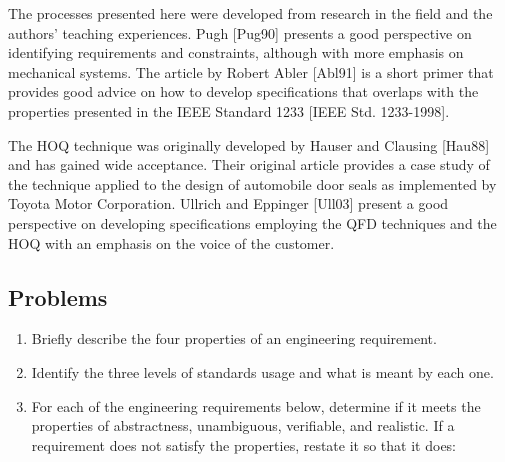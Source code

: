 The processes presented here were developed from research in the field
and the authors' teaching experiences. Pugh {[}Pug90{]} presents a good
perspective on identifying requirements and constraints, although with
more emphasis on mechanical systems. The article by Robert Abler
{[}Abl91{]} is a short primer that provides good advice on how to
develop specifications that overlaps with the properties presented in
the IEEE Standard 1233 {[}IEEE Std. 1233-1998{]}.

The HOQ technique was originally developed by Hauser and Clausing
{[}Hau88{]} and has gained wide acceptance. Their original article
provides a case study of the technique applied to the design of
automobile door seals as implemented by Toyota Motor Corporation.
Ullrich and Eppinger {[}Ull03{]} present a good perspective on
developing specifications employing the QFD techniques and the HOQ with
an emphasis on the voice of the customer.

\subsection{Problems}\label{problems}

\begin{enumerate}
\def\labelenumi{\arabic{enumi}.}
\item
  Briefly describe the four properties of an engineering requirement.
\item
  Identify the three levels of standards usage and what is meant by each
  one.
\item
  For each of the engineering requirements below, determine if it meets
  the properties of abstractness, unambiguous, verifiable, and
  realistic. If a requirement does not satisfy the properties, restate
  it so that it does:
\end{enumerate}


